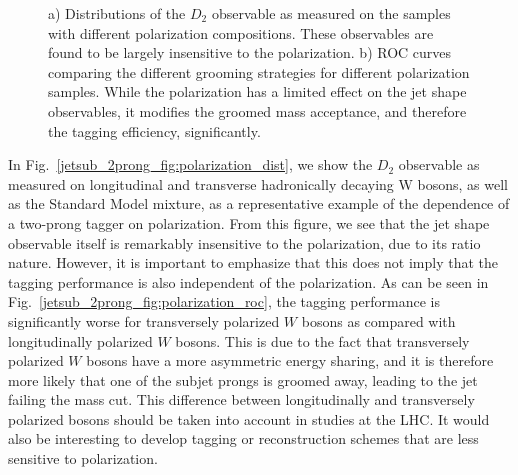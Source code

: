 \documentclass[11pt,letterpaper]{article}
\begin{document}
\begin{figure}
\begin{center}
\end{center}
\caption{a) Distributions of the $D_2$ observable as measured on the samples with different polarization compositions. These observables are found to be largely insensitive to the polarization. b) ROC curves comparing the different grooming strategies for different polarization samples. While the polarization has a limited effect on the jet shape observables, it modifies the groomed mass acceptance, and therefore the tagging efficiency, significantly.}
\end{figure}


In Fig.~\ref{jetsub_2prong_fig:polarization_dist}, we show the $D_2$ observable as measured on longitudinal and transverse hadronically decaying W bosons, as well as the Standard Model mixture, as a representative example of the dependence of a two-prong tagger on polarization.
%
From this figure, we see that the jet shape observable itself is remarkably insensitive to the polarization, due to its ratio nature.
%
However, it is important to emphasize that this does not imply that the tagging performance is also independent of the polarization.
%
As can be seen in Fig.~\ref{jetsub_2prong_fig:polarization_roc}, the tagging performance is significantly worse for transversely polarized $W$ bosons as compared with longitudinally polarized $W$ bosons.
%
This is due to the fact that transversely polarized $W$ bosons have a more asymmetric energy sharing, and it is therefore more likely that one of the subjet prongs is groomed away, leading to the jet failing the mass cut.
%
This difference between longitudinally and transversely polarized bosons should be taken into account in studies at the LHC.
%
It would also be interesting to develop tagging or reconstruction schemes that are less sensitive to polarization.
\end{document}
